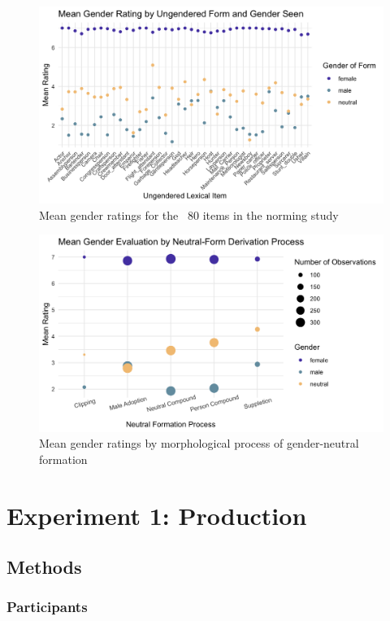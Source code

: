 \documentclass{article}
\begin{document}
	\begin{figure}[h!]
		\centering
		\includegraphics[scale=0.2]{norming_values.png}
		\caption{Mean gender ratings for the ~80 items in the norming study}
	\end{figure}
	
	\begin{figure}[h!]
		\centering
		\includegraphics[scale=0.2]{norming_deriv.png}
		\caption{Mean gender ratings by morphological process of gender-neutral formation}
	\end{figure}
	
	\newpage
	\section{Experiment 1: Production}
	
	\subsection{Methods}
	
	\subsubsection{Participants}
	
\end{document}
